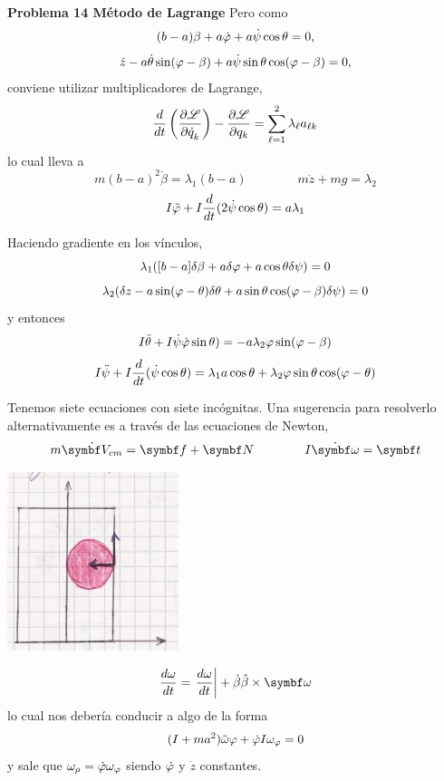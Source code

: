 \documentclass[10pt,oneside]{CBFT_book}
\begin{document}
\begin{ejemplo}{\bf Problema 14 Método de Lagrange}
Pero como
\[
	(b-a) \beta + a \dot{\varphi} + a \dot{\psi} \cos\theta = 0 ,
\]
\[
	\dot{z} -a \dot{\theta} \sin(\varphi-\beta) + a\dot{\psi}\sin\theta\cos(\varphi -\beta) = 0,
\]
conviene utilizar multiplicadores de Lagrange,
\[
	\frac{d^{\hspace{-0.05em}} {}}{d {t}^{\hspace{-0.05em}}}\left( \frac{\partial^{\hspace{-0.05em}} {\mathscr{L}}}{\partial {\dot{q}_k}^{\hspace{-0.05em}}} \right) - \frac{\partial^{\hspace{-0.05em}} {\mathscr{L}}}{\partial {q_k}^{\hspace{-0.05em}}} = \sum_{\ell=1}^2 \lambda_\ell a_{\ell k}
\]
lo cual lleva a 
\[
	m(b-a)^2 \ddot{\beta} = \lambda_1 (b-a) \qquad \qquad 
	m \ddot{z} + m g = \lambda_2
\]
\[
	I \ddot{\varphi} + I \frac{d^{\hspace{-0.05em}} {}}{d {t}^{\hspace{-0.05em}}}( 2 \dot{\psi} \cos\theta ) = a \lambda_1
\]

Haciendo gradiente en los vínculos,
\[
	\lambda_1 ( [b-a] \delta\beta + a\delta\varphi + a\cos\theta\delta\psi) = 0
\]
\[
	\lambda_2 (\delta z - a\sin(\varphi-\theta)\delta\theta + a\sin\theta \cos(\varphi-\beta)\delta\psi) = 0
\]
y entonces
\[
	I \ddot{\theta} +  I \dot{\psi} \dot{\varphi} \sin\theta ) =
	- a \lambda_2 \varphi \sin (\varphi - \beta)
\]
\[
	I \ddot{\psi} +  I \frac{d^{\hspace{-0.05em}} {}}{d {t}^{\hspace{-0.05em}}}( \dot{\psi} \cos\theta ) =
	\lambda_1 a \cos\theta + \lambda_2 \varphi \sin \theta \cos(\varphi - \theta)
\]

Tenemos siete ecuaciones con siete incógnitas. Una sugerencia para resolverlo alternativamente
es a través de las ecuaciones de Newton,
\[
	m\dot{\vb{V}_{cm}} = \vb{f} + \vb{N} \qquad \qquad 
	I \dot{\vb{\omega}} = \vb{t}
\]

\includegraphics[scale=0.5]{images/fig_mc_lagrangebola_2.jpg}

\[
	\dtot{\omega}{t} = \left.\dtot{\omega}{t}\right| + \dot{\beta}\hat{\beta} \times \vb{\omega}
\]
lo cual nos debería conducir a algo de la forma
\[
	(I + ma^2)\ddot{\omega}\varphi + \dot{\varphi} I \omega_\varphi = 0
\]
y sale que $\omega_\rho = \dot{\varphi} \omega_\varphi$ siendo $\dot{\varphi}$ y $\dot{z}$ constantes.

\end{ejemplo}
\end{document}

